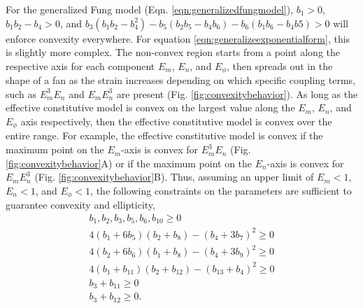      For the generalized Fung model (Eqn. \ref{eqn:generalizedfungmodel}), $b_1>0$, $b_1b_2-b_4>0$, and $b_3(b_1b_2 - b_4^2) - b_5(b_2b_5 - b_4b_6) - b_6(b_1b_6 - b_4b5)>0$ will enforce convexity everywhere. For equation \ref{eqn:generalizeexponentialform}, this is slightly more complex. The non-convex region starts from a point along the respective axis for each component $E_m$, $E_n$, and $E_\phi$, then spreads out in the shape of a fan as the strain increases depending on which specific coupling terms, such as $E_m^3 E_n$ and $E_m E_n^3$ are present (Fig. \ref{fig:convexitybehavior}). As long as the effective constitutive model is convex on the largest value along the $E_m$, $E_n$, and $E_\phi$ axis respectively, then the effective constitutive model is convex over the entire range. For example, the effective constitutive model is convex if the maximum point on the $E_m$-axis is convex for $E_m^3 E_n$ (Fig. \ref{fig:convexitybehavior}A) or if the maximum point on the $E_n$-axis is convex for $E_m E_n^3$ (Fig. \ref{fig:convexitybehavior}B). Thus, assuming an upper limit of $E_m < 1$, $E_n < 1$, and $E_\phi < 1$, the following constraints on the parameters are sufficient to guarantee convexity and ellipticity,
\begin{equation} \label{eqn:effmodelconstraints}
\begin{aligned}
b_1, b_2,b_3,b_5,b_6,b_{10} \geq 0	\\
4(b_1 + 6 b_5) (b_2 + b_8) - (b_4 + 3 b_7)^2 \geq 0		\\
4(b_2 + 6 b_6) (b_1 + b_8) - (b_4 + 3 b_9)^2 \geq 0 	\\
4(b_1 + b_{11}) (b_2 + b_{12}) - (b_{13} + b_4)^2 \geq 0 	\\
b_3+b_{11} \geq 0	\\
b_3+b_{12} \geq 0.	\\
\end{aligned}
\end{equation}



